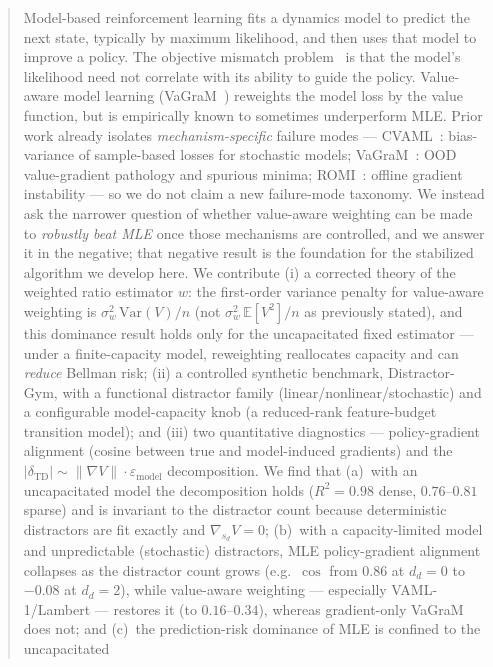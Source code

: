 \documentclass{article}
\theoremstyle{plain}
\begin{document}
\begin{abstract}
Model-based reinforcement learning fits a dynamics model to predict the next state,
typically by maximum likelihood, and then uses that model to improve a policy. The
objective mismatch problem~\citep{lambert2020objective} is that the model's likelihood
need not correlate with its ability to guide the policy. Value-aware model learning
(VaGraM~\citep{voelcker2022vagram}) reweights the model loss by the value function, but
is empirically known to sometimes underperform MLE. Prior work already isolates
\emph{mechanism-specific} failure modes --- CVAML~\citep{cvaml2025}: bias-variance of
sample-based losses for stochastic models; VaGraM~\citep{voelcker2022vagram}: OOD
value-gradient pathology and spurious minima; ROMI~\citep{romi2026}: offline gradient
instability --- so we do not claim a new failure-mode taxonomy. We instead ask the
narrower question of whether value-aware weighting can be made to \emph{robustly beat MLE}
once those mechanisms are controlled, and we answer it in the negative; that negative
result is the foundation for the stabilized algorithm we develop here. We
contribute (i) a corrected theory of the weighted ratio estimator $w$: the
first-order variance penalty for value-aware weighting is
$\sigma_w^2\,\mathrm{Var}(V)/n$ (not $\sigma_w^2\,\mathbb{E}[V^2]/n$ as previously
stated), and this dominance result holds only for the uncapacitated fixed estimator ---
under a finite-capacity model, reweighting reallocates capacity and can \emph{reduce}
Bellman risk; (ii) a controlled synthetic benchmark, Distractor-Gym, with a functional
distractor family (linear/nonlinear/stochastic) and a configurable model-capacity knob
(a reduced-rank feature-budget transition model); and (iii) two quantitative
diagnostics --- policy-gradient alignment (cosine between true and model-induced
gradients) and the
$\lvert\delta_{\mathrm{TD}}\rvert \sim \lVert \nabla V\rVert \cdot \varepsilon_{\mathrm{model}}$
decomposition. We find that (a)~with an uncapacitated model the decomposition holds
($R^2 = 0.98$ dense, $0.76$--$0.81$ sparse) and is invariant to the distractor count
because deterministic distractors are fit exactly and $\nabla_{s_d} V = 0$;
(b)~with a capacity-limited model and unpredictable (stochastic) distractors, MLE
policy-gradient alignment collapses as the distractor count grows (e.g.\ $\cos$ from
$0.86$ at $d_d=0$ to $-0.08$ at $d_d=2$), while value-aware weighting --- especially
VAML-1/Lambert --- restores it (to $0.16$--$0.34$), whereas gradient-only VaGraM does
not; and (c)~the prediction-risk dominance of MLE is confined to the uncapacitated

\end{abstract}
\end{document}

